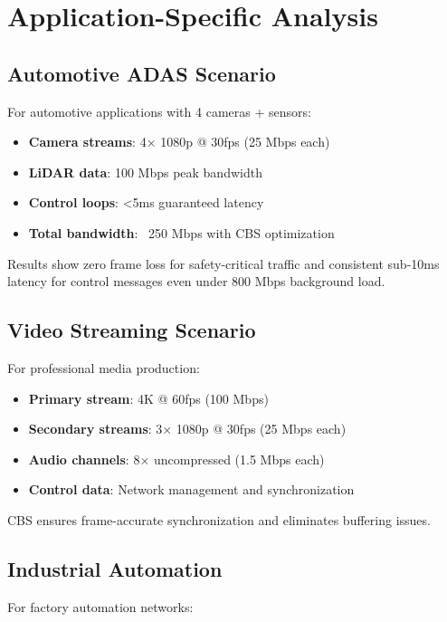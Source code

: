 \documentclass[10pt, journal, compsoc]{IEEEtran}
\begin{document}
\section{Application-Specific Analysis}

\subsection{Automotive ADAS Scenario}

For automotive applications with 4 cameras + sensors:

\begin{itemize}
    \item \textbf{Camera streams}: 4× 1080p @ 30fps (25 Mbps each)
    \item \textbf{LiDAR data}: 100 Mbps peak bandwidth
    \item \textbf{Control loops}: <5ms guaranteed latency
    \item \textbf{Total bandwidth}: ~250 Mbps with CBS optimization
\end{itemize}

Results show zero frame loss for safety-critical traffic and consistent sub-10ms latency for control messages even under 800 Mbps background load.

\subsection{Video Streaming Scenario}

For professional media production:

\begin{itemize}
    \item \textbf{Primary stream}: 4K @ 60fps (100 Mbps)
    \item \textbf{Secondary streams}: 3× 1080p @ 30fps (25 Mbps each)
    \item \textbf{Audio channels}: 8× uncompressed (1.5 Mbps each)
    \item \textbf{Control data}: Network management and synchronization
\end{itemize}

CBS ensures frame-accurate synchronization and eliminates buffering issues.

\subsection{Industrial Automation}

For factory automation networks:
\end{document}

